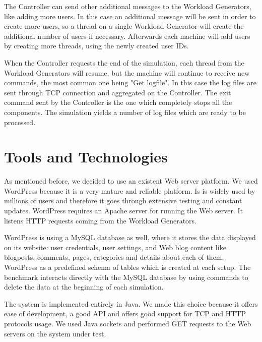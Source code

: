 The Controller can send other additional messages to the Workload Generators, like adding more users. In this case an additional message will be sent in order to create more users, so a thread on a single Workload Generator will create the additional number of users if necessary. Afterwards each machine will add users by creating more threads, using the newly created user IDs. 

When the Controller requests the end of the simulation, each thread from the Workload Generators will resume, but the machine will continue to receive new commands, the most common one being "Get logfile". In this case the log files are sent through TCP connection and aggregated on the Controller. The exit command sent by the Controller is the one which completely stops all the components. The simulation yields a number of log files which are ready to be processed.

\section{Tools and Technologies}
\label{sec:tools-and-technologies}

As mentioned before, we decided to use an existent Web server platform. We used WordPress because it is a very mature and reliable platform. Is is widely used by millions of users and therefore it goes through extensive testing and constant updates. WordPress requires an Apache server for running the Web server. It listens HTTP requests coming from the Workload Generators. 

WordPress is using a MySQL database as well, where it stores the data displayed on its website: user credentials, user settings, and Web blog content like blogposts, comments, pages, categories and details about each of them. WordPress as a predefined schema of tables which is created at each setup. The benchmark interacts directly with the MySQL database by using commands to delete the data at the beginning of each simulation.

The system is implemented entirely in Java. We made this choice because it offers ease of development, a good API and offers good support for TCP and HTTP protocols usage. We used Java sockets and performed GET requests to the Web servers on the system under test.
